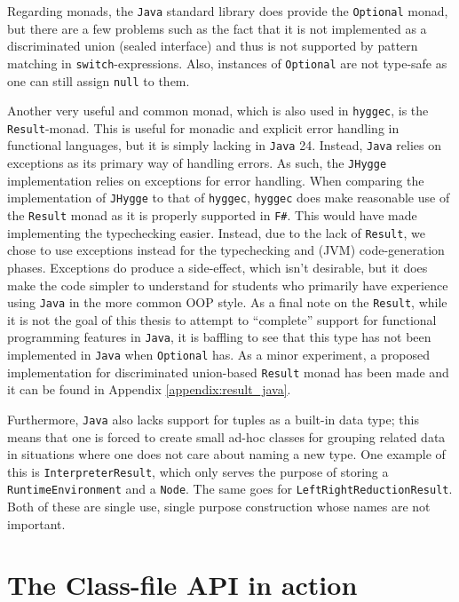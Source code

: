 Regarding monads, the \texttt{Java} standard library does provide the \texttt{Optional} monad, but there are a few problems such as the
fact that it is not implemented as a discriminated union (sealed interface) and thus is not supported by pattern matching in
\texttt{switch}-expressions. Also, instances of \texttt{Optional} are not type-safe as one can still assign \texttt{null} to them.

Another very useful and common monad, which is also used in \texttt{hyggec}, is the \texttt{Result}-monad. This is useful for monadic
and explicit error handling in functional languages, but it is simply lacking in \texttt{Java} 24. Instead, \texttt{Java} relies on
exceptions as its primary way of handling errors. As such, the \texttt{JHygge} implementation relies on exceptions for error handling.
When comparing the implementation of \texttt{JHygge} to that of \texttt{hyggec}, \texttt{hyggec} does make reasonable use of the \texttt{Result}
monad as it is properly supported in \texttt{F\#}. This would have made implementing the typechecking easier. Instead, due to the lack
of \texttt{Result}, we chose to use exceptions instead for the typechecking and (JVM) code-generation phases. Exceptions do produce a
side-effect, which isn't desirable, but it does make the code simpler to understand for students who primarily have experience using
\texttt{Java} in the more common OOP style. As a final note on the \texttt{Result}, while it is not the goal of this thesis to attempt
to ``complete'' support for functional programming features in \texttt{Java}, it is baffling to see that this type has not been implemented
in \texttt{Java} when \texttt{Optional} has. As a minor experiment, a proposed implementation for discriminated union-based \texttt{Result}
monad has been made and it can be found in Appendix \ref{appendix:result_java}.

Furthermore, \texttt{Java} also lacks support for tuples as a built-in data type; this means that one is forced to create small ad-hoc
classes for grouping related data in situations where one does not care about naming a new type. One example of this is \texttt{InterpreterResult},
which only serves the purpose of storing a \texttt{RuntimeEnvironment} and a \texttt{Node}. The same goes for \texttt{LeftRightReductionResult}.
Both of these are single use, single purpose construction whose names are not important.

\section{The Class-file API in action}

